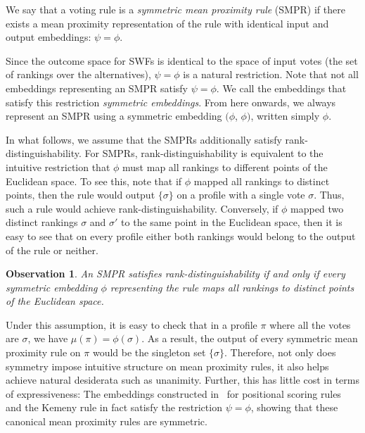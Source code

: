 \documentclass[prodmode,acmec]{ec-acmsmall}
\newtheorem{observation}[theorem]{Observation}
\begin{document}
\begin{definition}
We say that a voting rule is a \emph{symmetric mean proximity rule} (SMPR) if there exists a mean proximity representation of the rule with identical input and output embeddings: $\psi = \phi$. 
\end{definition} 
%
Since the outcome space for SWFs is identical to the space of input votes (the set of rankings over the alternatives), $\psi = \phi$ is a natural restriction. Note that not all embeddings representing an SMPR satisfy $\psi = \phi$. We call the embeddings that satisfy this restriction \emph{symmetric embeddings}. From here onwards, we always represent an SMPR using a symmetric embedding $(\phi$, $\phi)$, written simply $\phi$.

In what follows, we assume that the SMPRs additionally satisfy rank-distinguishability. For SMPRs, rank-distinguishability is equivalent to the intuitive restriction that $\phi$ must map all rankings to different points of the Euclidean space. To see this, note that if $\phi$ mapped all rankings to distinct points, then the rule would output $\{\sigma\}$ on a profile with a single vote $\sigma$. Thus, such a rule would achieve rank-distinguishability. Conversely, if $\phi$ mapped two distinct rankings $\sigma$ and $\sigma'$ to the same point in the Euclidean space, then it is easy to see that on every profile either both rankings would belong to the output of the rule or neither. 


\begin{observation}
An SMPR satisfies rank-distinguishability if and only if every symmetric embedding $\phi$ representing the rule maps all rankings to distinct points of the Euclidean space. 
\end{observation}
%
Under this assumption, it is easy to check that in a profile $\pi$ where all the votes are $\sigma$, we have $\mu(\pi) = \phi(\sigma)$. As a result, the output of every symmetric mean proximity rule on $\pi$ would be the singleton set $\{\sigma\}$. Therefore, not only does symmetry impose intuitive structure on mean proximity rules, it also helps achieve natural desiderata such as unanimity. Further, this has little cost in terms of expressiveness: The embeddings constructed in~\cite{Zwicker08a} for positional scoring rules and the Kemeny rule in fact satisfy the restriction $\psi = \phi$, showing that these canonical mean proximity rules are symmetric. 
\end{document}

